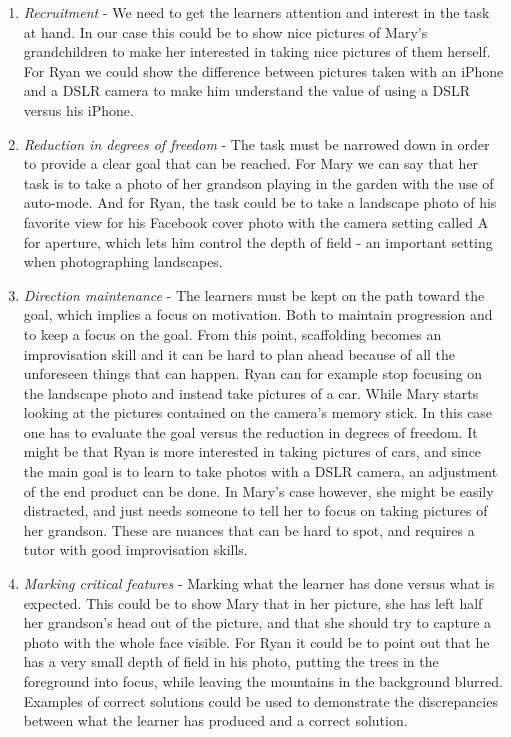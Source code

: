 \begin{enumerate}
\item{} \emph{Recruitment} - We need to get the learners attention and interest in the task at hand. In our case this could be to show nice pictures of Mary's grandchildren to make her interested in taking nice pictures of them herself. For Ryan we could show the difference between pictures taken with an iPhone and a DSLR camera to make him understand the value of using a DSLR versus his iPhone.

\item{} \emph{Reduction in degrees of freedom} - The task must be narrowed down in order to provide a clear goal that can be reached. For Mary we can say that her task is to take a photo of her grandson playing in the garden with the use of auto-mode. And for Ryan, the task could be to take a landscape photo of his favorite view for his Facebook cover photo with the camera setting called A for aperture, which lets him control the depth of field - an important setting when photographing landscapes. 

\item{} \emph{Direction maintenance} - The learners must be kept on the path toward the goal, which implies a focus on motivation. Both to maintain progression and to keep a focus on the goal. From this point, scaffolding becomes an improvisation skill and it can be hard to plan ahead because of all the unforeseen things that can happen. Ryan can for example stop focusing on the landscape photo and instead take pictures of a car. While Mary starts looking at the pictures contained on the camera's memory stick. In this case one has to evaluate the goal versus the reduction in degrees of freedom. It might be that Ryan is more interested in taking pictures of cars, and since the main goal is to learn to take photos with a DSLR camera, an adjustment of the end product can be done. In Mary's case however, she might be easily distracted, and just needs someone to tell her to focus on taking pictures of her grandson. These are nuances that can be hard to spot, and requires a tutor with good improvisation skills.

\item{} \emph{Marking critical features} - Marking what the learner has done versus what is expected. This could be to show Mary that in her picture, she has left half her grandson's head out of the picture, and that she should try to capture a photo with the whole face visible. For Ryan it could be to point out that he has a very small depth of field in his photo, putting the trees in the foreground into focus, while leaving the mountains in the background blurred. Examples of correct solutions could be used to demonstrate the discrepancies between what the learner has produced and a correct solution.


\end{enumerate}
